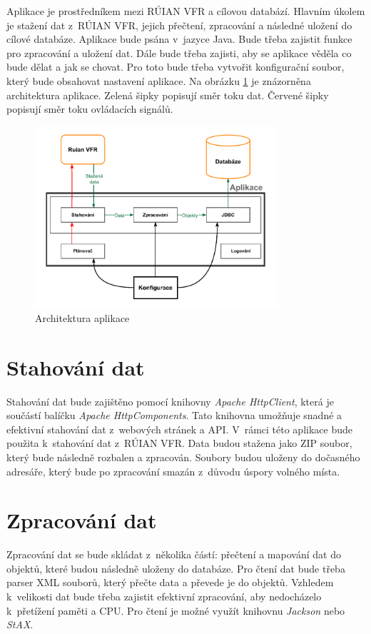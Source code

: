 Aplikace je prostředníkem mezi RÚIAN VFR a cílovou databází.
Hlavním úkolem je stažení dat z~RÚIAN VFR, jejich přečtení, zpracování a následné uložení do cílové databáze.
Aplikace bude psána v~jazyce Java. Bude třeba zajistit funkce pro zpracování a uložení dat.
Dále bude třeba zajisti, aby se aplikace věděla co bude dělat a jak se chovat.
Pro toto bude třeba vytvořit konfigurační soubor, který bude obsahovat nastavení aplikace.
Na obrázku \ref{fig:architektura} je znázorněna architektura aplikace.
Zelená šipky popisují směr toku dat.
Červené šipky popisují směr toku ovládacích signálů.

\begin{figure}[!h]
    \centering
    \includegraphics[width=0.8\textwidth]{figures/Aplikace_Scheme.pdf}
    \caption{Architektura aplikace}
    \label{fig:architektura}
\end{figure}

\newpage

\section{Stahování dat}
Stahování dat bude zajištěno pomocí knihovny \textit{Apache HttpClient}, která je 
součástí balíčku \textit{Apache HttpComponents}. 
Tato knihovna umožňuje snadné a efektivní stahování dat z~webových stránek a API. 
V~rámci této aplikace bude použita k~stahování dat z~RÚIAN VFR.
Data budou stažena jako ZIP soubor, který bude následně rozbalen a zpracován.
Soubory budou uloženy do dočasného adresáře, který bude po zpracování smazán z~důvodu úspory volného místa.

\section{Zpracování dat}
Zpracování dat se bude skládat z~několika částí:
přečtení a mapování dat do objektů, které budou následně uloženy do databáze.
Pro čtení dat bude třeba parser XML souborů, který přečte data a převede je do objektů.
Vzhledem k~velikosti dat bude třeba zajistit efektivní zpracování, aby nedocházelo 
k~přetížení paměti a CPU.
Pro čtení je možné využít knihovnu \textit{Jackson} nebo \textit{StAX}.

